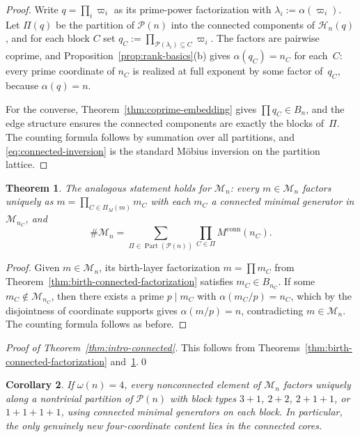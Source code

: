 \documentclass[11pt,letterpaper]{article}
\numberwithin{equation}{section}
\theoremstyle{plain}
\newtheorem{theorem}{Theorem}[section]
\newtheorem{corollary}[theorem]{Corollary}
\theoremstyle{definition}
\theoremstyle{remark}
\begin{document}
\begin{proof}
Write $q=\prod_i\varpi_i$ as its prime-power factorization with
$\lambda_i:=\alpha(\varpi_i)$. Let $\Pi(q)$ be the partition of
$\mathcal P(n)$ into the connected components of $\mathcal H_n(q)$, and for
each block $C$ set $q_C:=\prod_{\mathcal P(\lambda_i)\subseteq C}\varpi_i$.
The factors are pairwise coprime, and
Proposition~\ref{prop:rank-basics}(b) gives $\alpha(q_C)=n_C$ for each~$C$:
every prime coordinate of $n_C$ is realized at full exponent by some factor
of~$q_C$, because $\alpha(q)=n$.

For the converse, Theorem~\ref{thm:coprime-embedding} gives
$\prod q_C\in B_n$, and the edge structure ensures the connected components
are exactly the blocks of~$\Pi$. The counting formula follows by summation
over all partitions, and \eqref{eq:connected-inversion} is the standard
M\"obius inversion on the partition lattice.
\end{proof}

\begin{theorem}\label{thm:mingenerator-connected-factorization}
The analogous statement holds for $\mathcal M_n$: every $m\in\mathcal M_n$
factors uniquely as $m=\prod_{C\in\Pi_M(m)}m_C$ with each $m_C$
a connected minimal generator in $\mathcal M_{n_C}$, and
\[
\#\mathcal M_n=\sum_{\Pi\in\operatorname{Part}(\mathcal P(n))}
\prod_{C\in\Pi}M^{\mathrm{conn}}(n_C).
\]
\end{theorem}

\begin{proof}
Given $m\in\mathcal M_n$, its birth-layer factorization
$m=\prod m_C$ from Theorem~\ref{thm:birth-connected-factorization}
satisfies $m_C\in B_{n_C}$. If some $m_C\notin\mathcal M_{n_C}$, then
there exists a prime $p\mid m_C$ with $\alpha(m_C/p)=n_C$, which by the
disjointness of coordinate supports gives $\alpha(m/p)=n$, contradicting
$m\in\mathcal M_n$. The counting formula follows as before.
\end{proof}

\noindent\emph{Proof of Theorem~\ref{thm:intro-connected}.}
This follows from Theorems~\ref{thm:birth-connected-factorization}
and~\ref{thm:mingenerator-connected-factorization}.\qed

\begin{corollary}\label{cor:four-support-reduction}
If $\omega(n)=4$, every nonconnected element of $\mathcal M_n$ factors
uniquely along a nontrivial partition of $\mathcal P(n)$ with block types
$3{+}1$, $2{+}2$, $2{+}1{+}1$, or $1{+}1{+}1{+}1$, using connected
minimal generators on each block. In particular, the only genuinely new
four-coordinate content lies in the connected cores.
\end{corollary}
\end{document}
